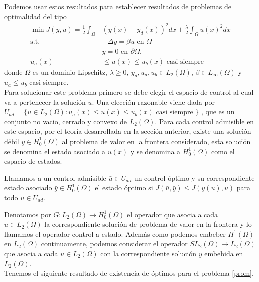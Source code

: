 \documentclass{article}
\begin{document}
\noindent
Podemos usar estos resultados para establecer resultados de problemas de optimalidad del tipo 
\begin{equation}
\label{prom}
    \begin{split}
        \min J(y,u)=\frac{1}{2}\int_{\Omega}&(y(x)-y_d(x))^2dx+\frac{\lambda}{2}\int_{\Omega}u(x)^2dx\\
        \text{s.t.  }& -\Delta y=\beta u \text{ en } \Omega\\
        &y=0 \text{  en   }\partial\Omega.\\
        u_a(x)&\leq u(x)\leq u_b(x) \text{ casi siempre}
    \end{split}
\end{equation}
donde $\Omega$ es un dominio Lipschitz, $\lambda\geq 0$, $y_d,u_a,u_b\in L_2(\Omega)$, $\beta\in L_{\infty}(\Omega)$ y $u_a\leq u_b$ casi siempre. \\

\noindent
Para solucionar este problema primero se debe elegir el espacio de control al  cual va a pertenecer la solución $u$. Una elección razonable viene dada por $U_{ad}=\{u\in L_2(\Omega): u_a(x)\leq u(x) \leq u_b(x)\text{ casi siempre }\}$ , que es un conjunto no vacio, cerrado y convexo de $L_2(\Omega)$. Para cada control admisible en este espacio, por el teoría desarrollada en la sección anterior, existe una solución débil $y\in H_{0}^{1}(\Omega)$ al problema de valor en la frontera considerado, esta solución se denomina el estado asociado a $u(x)$ y se denomina a $H_{0}^{1}(\Omega)$ como el espacio de estados.

\begin{definition}
Llamamos a un control admisible $\bar{u} \in U_{ad}$ un control óptimo y su correspondiente estado asociado $\bar{y}\in H_{0}^{1}(\Omega)$ el estado óptimo si $J(\bar{u},\bar{y})\leq J(y(u),u)$ para todo $u \in U_{ad}$.
\end{definition}

\noindent
Denotamos por $G:L_2(\Omega)\to H_{0}^{1}(\Omega)$ el operador que asocia a cada $u\in L_2(\Omega)$ la correspondiente solución de problema de valor en la frontera y lo llamamos el operador control-a-estado. Además como podemos embeber $H^1(\Omega)$ en $L_2(\Omega)$ continuamente, podemos considerar el operador $SL_2(\Omega)\to L_2(\Omega)$ que asocia a cada $u\in L_2(\Omega)$ con la correspondiente solución $y$ embebida en $L_2(\Omega)$.\\

\noindent
Tenemos el siguiente resultado de existencia de óptimos para el problema \ref{prom}.
\end{document}
